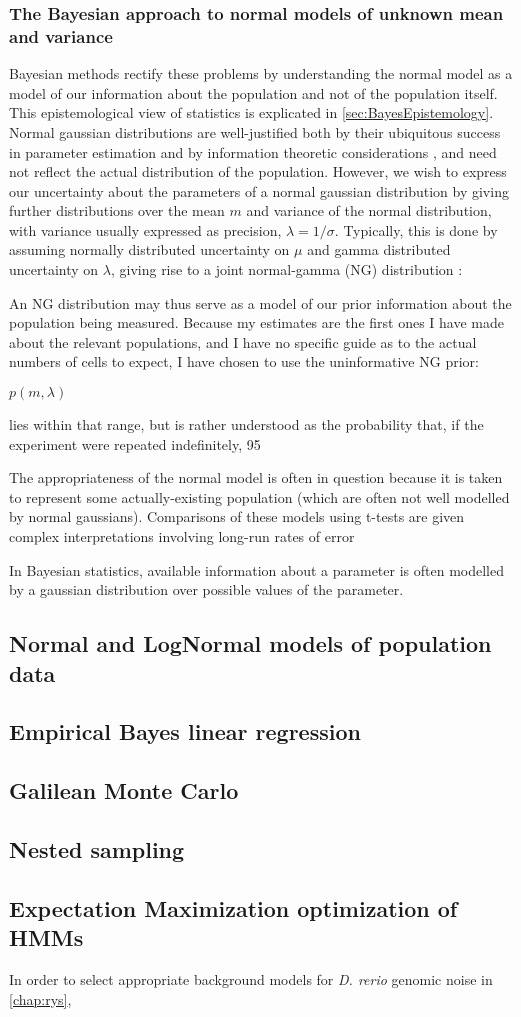 \subsubsection{The Bayesian approach to normal models of unknown mean and variance}
Bayesian methods rectify these problems by understanding the normal model as a model of our information about the population and not of the population itself. This epistemological view of statistics is explicated in \autoref{sec:BayesEpistemology}. Normal gaussian distributions are well-justified both by their ubiquitous success in parameter estimation and by information theoretic considerations \cite{Jaynes2003}, and need not reflect the actual distribution of the population. However, we wish to express our uncertainty about the parameters of a normal gaussian distribution by giving further distributions over the mean $m$ and variance of the normal distribution, with variance usually expressed as precision, $\lambda = 1/\sigma$. Typically, this is done by  assuming normally distributed uncertainty on $\mu$ and gamma distributed uncertainty on $\lambda$, giving rise to a joint normal-gamma (NG) distribution \cite{Bernardo2000}:

An NG distribution may thus serve as a model of our prior information about the population being measured. Because my estimates are the first ones I have made about the relevant populations, and I have no specific guide as to the actual numbers of cells to expect, I have chosen to use the uninformative NG prior:

$p(m,\lambda)$

lies within that range, but is rather understood as the probability that, if the experiment were repeated indefinitely, 95

The appropriateness of the normal model is often in question because it is taken to represent some actually-existing population (which are often not well modelled by normal gaussians). Comparisons of these models using t-tests are given complex interpretations involving long-run rates of error

In Bayesian statistics, available information about a parameter is often modelled by a gaussian distribution over possible values of the parameter. 
\subsection{Normal and LogNormal models of population data}
\label{ssec:NormalModels}

\subsection{Empirical Bayes linear regression}
\label{ssec:EmpiricalBayes}


\subsection{Galilean Monte Carlo}
\label{ssec:GMC}

\subsection{Nested sampling}
\label{ssec:nested}


\subsection{Expectation Maximization optimization of HMMs}
\label{ssec:EM}
In order to select appropriate background models for \textit{D. rerio} genomic noise in \autoref{chap:rys}, 
